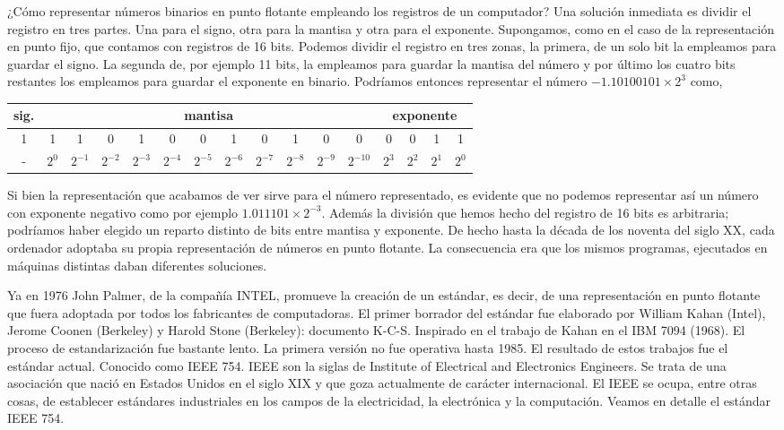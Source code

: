 ¿Cómo representar números binarios en punto flotante empleando los registros de un computador? Una solución inmediata es dividir el registro en tres partes. Una para el signo, otra para la mantisa y otra para el exponente. Supongamos, como en el caso de la representación en punto fijo, que contamos con registros de 16 bits.  Podemos dividir el registro en tres zonas, la primera, de un solo bit la empleamos para guardar el signo. La segunda de, por ejemplo 11 bits, la empleamos para guardar la mantisa del número y por último los cuatro bits restantes los empleamos para guardar el exponente en binario. Podríamos entonces representar el número  $-1.10100101\times 2^3$ como,
\begin{table}
\begin{tabular}{|c||c|c|c|c|c|c|c|c|c|c|c||c|c|c|c|}
\hline
sig.&\multicolumn{11}{c||}{mantisa}&\multicolumn{4}{c|}{exponente}\\
\hline
1&1&1&0&1&0&0&1&0&1&0&0&0&0&1&1\\
\hline
-&$2^{0}$&$2^{-1}$&$2^{-2}$&$2^{-3}$&$2^{-4}$&$2^{-5}$&$2^{-6}$&$2^{-7}$&$2^{-8}$&$2^{-9}$&$2^{-10}$&$2^{3}$&$2^{2}$&$2^{1}$&$2^{0}$\\
\hline
\end{tabular}
\end{table}

Si bien la representación que acabamos de ver sirve para el número representado, es evidente que no podemos representar así un número con exponente negativo como por ejemplo $1.011101\times 2^{-3}$. Además la división que hemos hecho del registro de 16 bits es arbitraria; podríamos haber elegido un reparto distinto de bits entre mantisa y exponente. De hecho hasta la década de los noventa del siglo XX, cada ordenador adoptaba su propia representación de números en punto flotante. La consecuencia era que los mismos programas, ejecutados en máquinas distintas daban diferentes soluciones. 

Ya en 1976 John Palmer, de la compañía INTEL, promueve la creación de un estándar, es decir, de una representación en punto flotante que fuera adoptada por todos los fabricantes de computadoras. El primer borrador del estándar fue elaborado por William Kahan (Intel), Jerome Coonen (Berkeley) y Harold Stone (Berkeley): documento K-C-S. Inspirado en el trabajo de Kahan en el IBM 7094 (1968). El proceso de estandarización fue bastante lento. La primera versión no fue operativa hasta 1985. El resultado de estos trabajos fue el estándar actual. Conocido como IEEE 754. IEEE son la siglas de Institute of Electrical and Electronics Engineers. Se trata de una asociación que nació en Estados Unidos en el siglo XIX y que goza actualmente de carácter internacional. El IEEE se ocupa, entre otras cosas, de establecer estándares industriales en los campos de la electricidad, la electrónica y la computación. Veamos en detalle el estándar IEEE 754.

